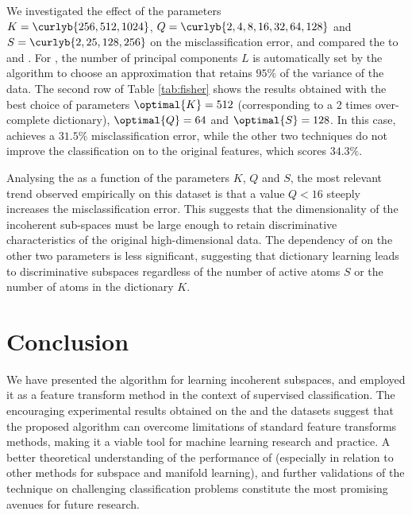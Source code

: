 \documentclass{article}
\def \nComponents{L} 	%
\def \nAto{K} 			%
\def \nActiveAtoms{S} 	%
\def \nDimSub{Q}
\begin{document}
We investigated the effect of the parameters \\ $\nAto=\curlyb{256,512,1024}$, $\nDimSub=\curlyb{2,4,8,16,32,64,128}$ and $\nActiveAtoms = \curlyb{2,25,128,256}$ on the misclassification error, and compared the  to  and . For , the number of principal components $\nComponents$ is automatically set by the algorithm to choose an approximation that retains $95\%$ of the variance of the data. The second row of Table \ref{tab:fisher} shows the results obtained with the best choice of parameters $\optimal{\nAto}=512$ (corresponding to a 2 times over-complete dictionary), $\optimal{\nDimSub}=64$ and $\optimal{\nActiveAtoms}=128$. In this case,  achieves a $31.5\%$ misclassification error, while the other two techniques do not improve the  classification on to the original features, which scores $34.3\%$. 

Analysing the  as a function of the parameters $\nAto$, $\nDimSub$ and $\nActiveAtoms$, the most relevant trend observed empirically on this dataset is that a value $\nDimSub<16$ steeply increases the misclassification error. This suggests that the dimensionality of the incoherent sub-spaces must be large enough to retain discriminative characteristics of the original high-dimensional data. The dependency of  on the other two parameters is less significant, suggesting that dictionary learning leads to discriminative subspaces regardless of the number of active atoms $\nActiveAtoms$ or the number of atoms in the dictionary $\nAto$. 
\section{Conclusion}\label{sec:end}
We have presented the  algorithm for learning incoherent subspaces, and employed it as a feature transform method in the context of supervised classification. The encouraging experimental results obtained on the  and the  datasets suggest that the proposed algorithm can overcome limitations of standard feature transforms methods, making it a viable tool for machine learning research and practice. A better theoretical understanding of the performance of  (especially in relation to other methods for subspace and manifold learning), and further validations of the technique on challenging classification problems constitute the most promising avenues for future research.



\end{document}
